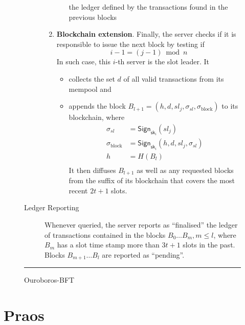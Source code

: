 \begin{figure}
\begin{description}
\begin{enumerate}
\begin{enumerate}
    the ledger defined by the transactions found in the previous blocks
  \end{enumerate}
%
  \item \textbf{Blockchain extension}.\label{bft:extension} Finally, the server
  checks if it is responsible to issue the next block by testing if
%
  \begin{equation}
    i - 1 = (j - 1) \bmod n
  \label{bft:leadershipcheck}
  \end{equation}
%
  In such case, this $i$-th server is the slot leader. It
%
  \begin{itemize}
    \item collects the set $d$ of all valid transactions from its mempool and
    \item appends the block $B_{l+1} = (h, d, \mathit{sl}_j, \sigma_\mathit{sl}, \sigma_\mathrm{block})$ to its blockchain, where
    \begin{equation*}
      \begin{split}
      \sigma_\mathit{sl}    & = \mathsf{Sign}_{\mathsf{sk}_i}(\mathit{sl}_j) \\
      \sigma_\mathrm{block} & = \mathsf{Sign}_{\mathsf{sk}_i}(h, d, \mathit{sl}_j, \sigma_\mathit{sl}) \\
      h                     & = H(B_l) \\
      \end{split}
    \end{equation*}
    It then diffuses $B_{l+1}$ as well as any requested blocks from the suffix of its blockchain that covers the most recent $2t + 1$ slots.
    \end{itemize}

  \end{enumerate}

  \item[Ledger Reporting] Whenever queried, the server reports as ``finalised'' the ledger of transactions contained in the blocks $B_0 \ldots B_m, m \le l$, where $B_m$ has a slot time stamp more than $3t + 1$ slots in the past. Blocks $B_{m+1} \ldots B_l$ are reported as ``pending''.
\end{description}

\hrule
\caption{\label{figure:bft}Ouroboros-BFT \cite[Figure 1]{cryptoeprint:2018:1049}}
\end{figure}



\section{Praos}
\label{praos}

